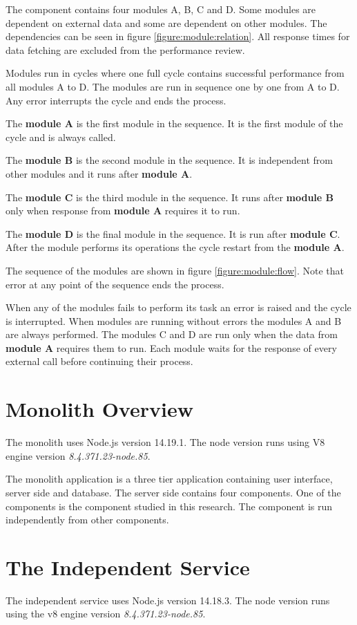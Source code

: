 The component contains four modules A, B, C and D.
Some modules are dependent on external data and some are dependent on other modules.
The dependencies can be seen in figure \ref{figure:module:relation}.
All response times for data fetching are excluded from the performance review.

Modules run in cycles where one full cycle contains successful performance from all modules A to D.
The modules are run in sequence one by one from A to D.
Any error interrupts the cycle and ends the process.

The \textbf{module A} is the first module in the sequence.
It is the first module of the cycle and is always called.

The \textbf{module B} is the second module in the sequence.
It is independent from other modules and it runs after \textbf{module A}.

The \textbf{module C} is the third module in the sequence.
It runs after \textbf{module B} only when response from \textbf{module A} requires it to run.

The \textbf{module D} is the final module in the sequence.
It is run after \textbf{module C}.
After the module performs its operations the cycle restart from the \textbf{module A}.

The sequence of the modules are shown in figure \ref{figure:module:flow}.
Note that error at any point of the sequence ends the process.

When any of the modules fails to perform its task an error is raised and the cycle is interrupted.
When modules are running without errors the modules A and B are always performed. 
The modules C and D are run only when the data from \textbf{module A} requires them to run.
Each module waits for the response of every external call before continuing their process.

\section{Monolith Overview}
The monolith uses Node.js version 14.19.1. The node version runs using V8 engine version \textit{8.4.371.23-node.85}.

The monolith application is a three tier application containing user interface, server side and database.
The server side contains four components.
One of the components is the component studied in this research.
The component is run independently from other components.

\section{The Independent Service}
The independent service uses Node.js version 14.18.3.
The node version runs using the v8 engine version \textit{8.4.371.23-node.85}.

